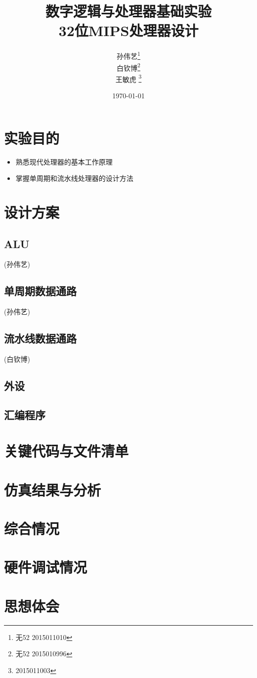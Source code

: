 \documentclass{ctexart}
\begin{document}
	\title{数字逻辑与处理器基础实验 \\ 32位MIPS处理器设计}
	\author{孙伟艺\thanks{无52 2015011010}\\ 白钦博\thanks{无52 2015010996} \\ 王敏虎 \thanks{2015011003}}
	\date{\today}
	\maketitle
	\clearpage

	\section{实验目的}
	\begin{itemize}
		\item 熟悉现代处理器的基本工作原理
		\item 掌握单周期和流水线处理器的设计方法
	\end{itemize}

	\section{设计方案}
		\subsection{ALU}
			(孙伟艺)
		\subsection{单周期数据通路}
			(孙伟艺)
		\subsection{流水线数据通路}
			(白钦博)
		\subsection{外设}
		\subsection{汇编程序}
	\section{关键代码与文件清单}
	\section{仿真结果与分析}
	\section{综合情况}
	\section{硬件调试情况}
	\section{思想体会}
\end{document}

